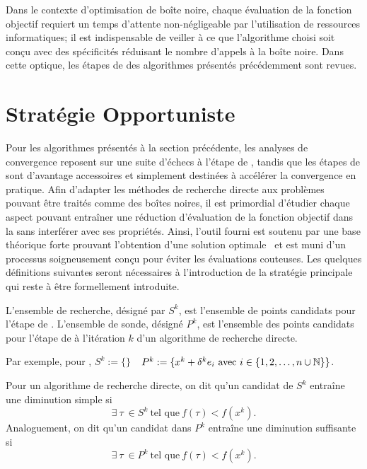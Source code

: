 \label{sec:Theme2}
Dans le contexte d'optimisation de boîte noire, chaque évaluation de la fonction objectif requiert un temps d'attente non-négligeable par l'utilisation de ressources informatiques; il est indispensable de veiller à ce que l'algorithme choisi soit conçu avec des spécificités réduisant le nombre d'appels à la boîte noire. Dans cette optique, les étapes de \POLL des algorithmes présentés précédemment sont revues.
\section{Stratégie Opportuniste}
Pour les algorithmes présentés à la section précédente, les analyses de convergence reposent sur une suite d'échecs à l'étape de \POLL, tandis que les étapes de \SEARCH sont d'avantage accessoires et simplement destinées à accélérer la convergence en pratique. Afin d'adapter les méthodes de recherche directe aux problèmes pouvant être traités comme des boîtes noires, il est primordial d'étudier chaque aspect pouvant entraîner une réduction d'évaluation de la fonction objectif dans la \POLL sans interférer avec ses propriétés. Ainsi, l'outil fourni est soutenu par une base théorique forte prouvant l'obtention d'une solution optimale~\cite{Torc97a,CoPr01a,AuDe2006,Kelley2011,KoLeTo03a} et est muni d'un processus soigneusement conçu pour éviter les évaluations couteuses. Les quelques définitions suivantes seront nécessaires à l'introduction de la stratégie principale qui reste à être formellement introduite.
\theoremstyle{definition}
\begin{definition}\label{def:3.1}
L'ensemble de recherche, désigné par $S^k$, est l'ensemble de points candidats pour l'étape de \SEARCH. L'ensemble de sonde, désigné $P^k$, est l'ensemble des points candidats pour l'étape de \POLL à l'itération $k$ d'un algorithme de recherche directe.
\end{definition} 
Par exemple, pour \CS, $S^k := \{\}$~~$P^k :=\{x^k +\delta^ke_i ~\text{avec}~ i \in \{1,2,\dots,n\cup\mathbb{N}\}\}$. 
\begin{definition}
\label{def:3.2}Pour un algorithme de recherche directe, on dit qu'un candidat de $S^k$ entraîne une diminution simple si 
\begin{equation}
\label{eq:3.1}\exists~\tau~\in S^k~ \text{tel que}~ f(\tau) < f(x^k).
\end{equation}
Analoguement, on dit qu'un candidat dans $P^k$ entraîne une diminution suffisante si 
\begin{equation}
\label{eq:3.2}\exists~\tau~\in P^k ~\text{tel que} ~ f(\tau) < f(x^k).
\end{equation}
\end{definition}
